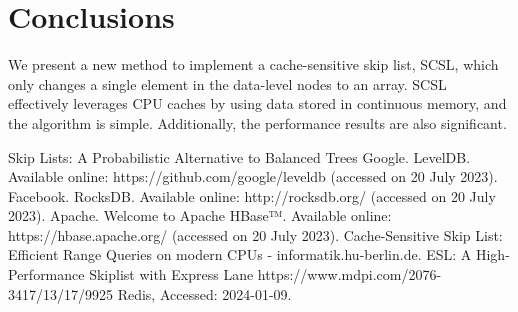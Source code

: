 \documentclass[sigconf, nonacm, letterpaper,top=2cm,bottom=2cm,left=3cm,right=3cm,marginparwidth=1.75cm]{acmart}
\begin{document}
\section{Conclusions}
We present a new method to implement a cache-sensitive skip list, SCSL, which only changes a single element in the data-level nodes to an array. SCSL effectively leverages CPU caches by using data stored in continuous memory, and the algorithm is simple. Additionally, the performance results are also significant.
\begin{thebibliography}{9} 
      Skip Lists: A Probabilistic Alternative to Balanced Trees
      Google. LevelDB. Available online: https://github.com/google/leveldb (accessed on 20 July 2023).
      Facebook. RocksDB. Available online: http://rocksdb.org/ (accessed on 20 July 2023).
      Apache. Welcome to Apache HBase™. Available online: https://hbase.apache.org/ (accessed on 20 July 2023).
      Cache-Sensitive Skip List: Efficient Range Queries on modern CPUs - informatik.hu-berlin.de.
      ESL: A High-Performance Skiplist with Express Lane  https://www.mdpi.com/2076-3417/13/17/9925
	Redis, Accessed: 2024-01-09.
\end{thebibliography}
\end{document}
